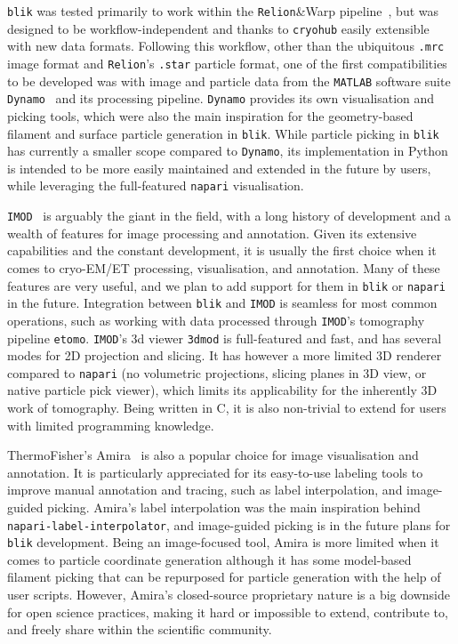 \vspace{\baselineskip}

\texttt{blik} was tested primarily to work within the \texttt{Relion}\&Warp pipeline~\cite{scheresRELIONImplementationBayesian2012,tegunovMultiparticleCryoEMRefinement2021,burtFlexibleFrameworkMultiparticle2021}, but was designed to be workflow-independent and thanks to \texttt{cryohub} easily extensible with new data formats. Following this workflow, other than the ubiquitous \texttt{.mrc} image format and \texttt{Relion}'s \texttt{.star} particle format, one of the first compatibilities to be developed was with image and particle data from the \texttt{MATLAB} software suite \texttt{Dynamo}~\cite{castano-diezDynamoFlexibleUserfriendly2012} and its processing pipeline. \texttt{Dynamo} provides its own visualisation and picking tools, which were also the main inspiration for the geometry-based filament and surface particle generation in \texttt{blik}. While particle picking in \texttt{blik} has currently a smaller scope compared to \texttt{Dynamo}, its implementation in Python is intended to be more easily maintained and extended in the future by users, while leveraging the full-featured \texttt{napari} visualisation.

\texttt{IMOD}~\cite{kremerComputerVisualizationThreeDimensional1996} is arguably the giant in the field, with a long history of development and a wealth of features for image processing and annotation. Given its extensive capabilities and the constant development, it is usually the first choice when it comes to cryo-EM/ET processing, visualisation, and annotation. Many of these features are very useful, and we plan to add support for them in \texttt{blik} or \texttt{napari} in the future. Integration between \texttt{blik} and \texttt{IMOD} is seamless for most common operations, such as working with data processed through \texttt{IMOD}'s tomography pipeline \texttt{etomo}. \texttt{IMOD}'s 3d viewer \texttt{3dmod} is full-featured and fast, and has several modes for 2D projection and slicing. It has however a more limited 3D renderer compared to \texttt{napari} (no volumetric projections, slicing planes in 3D view, or native particle pick viewer), which limits its applicability for the inherently 3D work of tomography. Being written in C, it is also non-trivial to extend for users with limited programming knowledge.

ThermoFisher's Amira~\cite{thermofisherAmiraSoftwareLife-} is also a popular choice for image visualisation and annotation. It is particularly appreciated for its easy-to-use labeling tools to improve manual annotation and tracing, such as label interpolation, and image-guided picking. Amira's label interpolation was the main inspiration behind \texttt{napari-label-interpolator}, and image-guided picking is in the future plans for \texttt{blik} development. Being an image-focused tool, Amira is more limited when it comes to particle coordinate generation although it has some model-based filament picking that can be repurposed for particle generation with the help of user scripts. However, Amira's closed-source proprietary nature is a big downside for open science practices, making it hard or impossible to extend, contribute to, and freely share within the scientific community.

